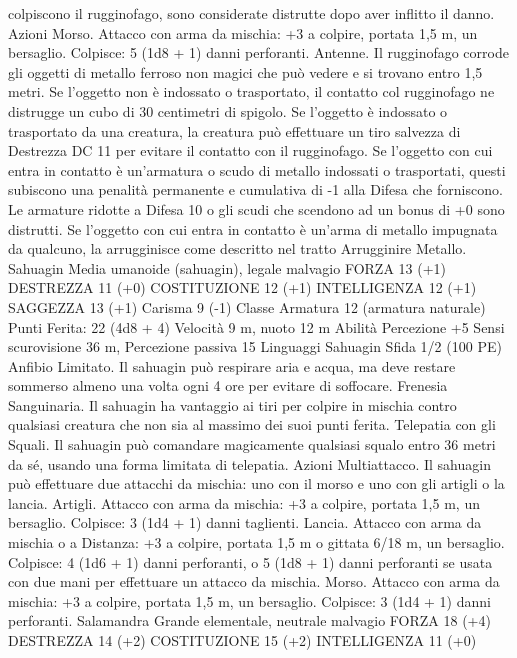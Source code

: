 \begin{multicols}{2}
colpiscono il rugginofago, sono considerate distrutte dopo aver
inflitto il danno.
Azioni
Morso. Attacco con arma da mischia: +3 a colpire, portata 1,5
m, un bersaglio.
Colpisce: 5 (1d8 + 1) danni perforanti.
Antenne. Il rugginofago corrode gli oggetti di metallo ferroso
non magici che può vedere e si trovano entro 1,5 metri. Se
l’oggetto non è indossato o trasportato, il contatto col
rugginofago ne distrugge un cubo di 30 centimetri di spigolo. Se
l’oggetto è indossato o trasportato da una creatura, la creatura
può effettuare un tiro salvezza di Destrezza DC 11 per evitare il
contatto con il rugginofago.
Se l’oggetto con cui entra in contatto è un’armatura o scudo di
metallo indossati o trasportati, questi subiscono una penalità
permanente e cumulativa di -1 alla Difesa che forniscono. Le
armature ridotte a Difesa 10 o gli scudi che scendono ad un bonus di
+0 sono distrutti. Se l’oggetto con cui entra in contatto è un’arma
di metallo impugnata da qualcuno, la arrugginisce come descritto
nel tratto Arrugginire Metallo.
Sahuagin
Media umanoide (sahuagin), legale malvagio
FORZA 13 (+1)
DESTREZZA 11 (+0)
COSTITUZIONE 12 (+1)
INTELLIGENZA 12 (+1)
SAGGEZZA 13 (+1)
Carisma 9 (-1)
Classe Armatura 12 (armatura naturale)
\hspace*{0pt}\hfill{Punti Ferita}: 22 (4d8 + 4)
Velocità 9 m, nuoto 12 m
Abilità Percezione +5
Sensi scurovisione 36 m, Percezione passiva 15
Linguaggi Sahuagin
Sfida 1/2 (100 PE)
Anfibio Limitato. Il sahuagin può respirare aria e acqua, ma deve
restare sommerso almeno una volta ogni 4 ore per evitare di
soffocare.
Frenesia Sanguinaria. Il sahuagin ha vantaggio ai tiri per
colpire in mischia contro qualsiasi creatura che non sia al
massimo dei suoi punti ferita.
Telepatia con gli Squali. Il sahuagin può comandare
magicamente qualsiasi squalo entro 36 metri da sé, usando una
forma limitata di telepatia.
Azioni
Multiattacco. Il sahuagin può effettuare due attacchi da mischia:
uno con il morso e uno con gli artigli o la lancia.
Artigli. Attacco con arma da mischia: +3 a colpire, portata 1,5
m, un bersaglio.
Colpisce: 3 (1d4 + 1) danni taglienti.
Lancia. Attacco con arma da mischia o a Distanza: +3 a colpire,
portata 1,5 m o gittata 6/18 m, un bersaglio.
Colpisce: 4 (1d6 + 1) danni perforanti, o 5 (1d8 + 1) danni
perforanti se usata con due mani per effettuare un attacco da
mischia.
Morso. Attacco con arma da mischia: +3 a colpire, portata 1,5
m, un bersaglio.
Colpisce: 3 (1d4 + 1) danni perforanti.
Salamandra
Grande elementale, neutrale malvagio
FORZA 18 (+4)
DESTREZZA 14 (+2)
COSTITUZIONE 15 (+2)
INTELLIGENZA 11 (+0)

\end{multicols}
